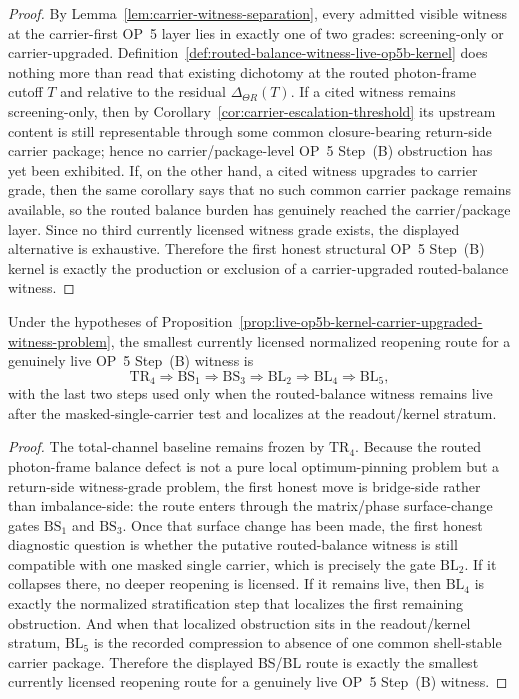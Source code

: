 \begin{proof}
By Lemma~\ref{lem:carrier-witness-separation}, every admitted visible witness at the carrier-first OP~5 layer lies in exactly one of two grades: screening-only or carrier-upgraded. Definition~\ref{def:routed-balance-witness-live-op5b-kernel} does nothing more than read that existing dichotomy at the routed photon-frame cutoff \(T\) and relative to the residual \(\Delta_{\Theta R}(T)\). If a cited witness remains screening-only, then by Corollary~\ref{cor:carrier-escalation-threshold} its upstream content is still representable through some common closure-bearing return-side carrier package; hence no carrier/package-level OP~5 Step~(B) obstruction has yet been exhibited. If, on the other hand, a cited witness upgrades to carrier grade, then the same corollary says that no such common carrier package remains available, so the routed balance burden has genuinely reached the carrier/package layer. Since no third currently licensed witness grade exists, the displayed alternative is exhaustive. Therefore the first honest structural OP~5 Step~(B) kernel is exactly the production or exclusion of a carrier-upgraded routed-balance witness.
\end{proof}

\begin{corollary}
\label{cor:first-normalized-reopening-route-live-op5b-kernel}
Under the hypotheses of Proposition~\ref{prop:live-op5b-kernel-carrier-upgraded-witness-problem}, the smallest currently licensed normalized reopening route for a genuinely live OP~5 Step~(B) witness is
\[
\mathrm{TR}_4 \Longrightarrow \mathrm{BS}_1 \Longrightarrow \mathrm{BS}_3 \Longrightarrow \mathrm{BL}_2 \Longrightarrow \mathrm{BL}_4 \Longrightarrow \mathrm{BL}_5,
\]
with the last two steps used only when the routed-balance witness remains live after the masked-single-carrier test and localizes at the readout/kernel stratum.
\end{corollary}

\begin{proof}
The total-channel baseline remains frozen by \(\mathrm{TR}_4\). Because the routed photon-frame balance defect is not a pure local optimum-pinning problem but a return-side witness-grade problem, the first honest move is bridge-side rather than imbalance-side: the route enters through the matrix/phase surface-change gates \(\mathrm{BS}_1\) and \(\mathrm{BS}_3\). Once that surface change has been made, the first honest diagnostic question is whether the putative routed-balance witness is still compatible with one masked single carrier, which is precisely the gate \(\mathrm{BL}_2\). If it collapses there, no deeper reopening is licensed. If it remains live, then \(\mathrm{BL}_4\) is exactly the normalized stratification step that localizes the first remaining obstruction. And when that localized obstruction sits in the readout/kernel stratum, \(\mathrm{BL}_5\) is the recorded compression to absence of one common shell-stable carrier package. Therefore the displayed BS/BL route is exactly the smallest currently licensed reopening route for a genuinely live OP~5 Step~(B) witness.
\end{proof}

